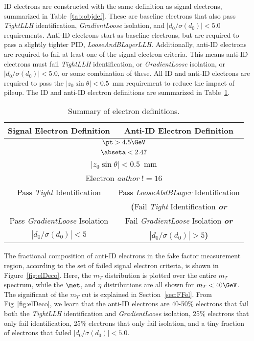 ID electrons are constructed with the same definition as signal electrons, summarized in Table~\ref{tab:objdef}.  These are baseline electrons that also pass \textit{TightLLH} identification, \textit{GradientLoose} isolation, and $|d_0/\sigma(d_0)|<5.0$ requirements.  Anti-ID electrons start as baseline electrons, but are required to pass a slightly tighter PID, \textit{LooseAndBLayerLLH}.  Additionally, anti-ID electrons are required to fail at least one of the signal electron criteria.  This means anti-ID electrons must fail \textit{TightLLH} identification, or \textit{GradientLoose} isolation, or $|d_0/\sigma(d_0)|<5.0$, or some combination of these. %
All ID and anti-ID electrons are required to pass the $|z_0\sin\theta| < 0.5$~mm requirement to reduce the impact of pileup.  The ID and anti-ID electron definitions are summarized in Table~\ref{tab:AllElDefs}. 
\begin{table}[!htb]
\begin{center}
\begin{tabular}{c|c}
\hline
Signal Electron Definition  & Anti-ID Electron Definition \\
\hline \hline
\multicolumn{2}{c}{$\pt > 4.5\GeV$}      \\
\multicolumn{2}{c}{$\abseta < 2.47$ }     \\
\multicolumn{2}{c}{$|z_0\sin\theta| < 0.5$~mm} \\
\multicolumn{2}{c}{Electron \textit{author} $!= 16$}\\
Pass \textit{Tight} Identification & Pass \textit{LooseAbdBLayer} Identification\\
      &             \textbf{(}Fail \textit{Tight} Identification \textbf{\textit{or}} \\
Pass \textit{GradientLoose} Isolation  & Fail \textit{GradientLoose} Isolation \textbf{\textit{or}} \\   
$|d_0/\sigma(d_0)| < 5$  &   $|d_0/\sigma(d_0)| > 5$\textbf{)} \\
\hline
\end{tabular}
\caption{Summary of electron definitions.}
\label{tab:AllElDefs}
\end{center}
\end{table}
The fractional composition of anti-ID electrons in the fake factor measurement region, according to the set of failed signal electron criteria, is shown in Figure~\ref{fig:elDeco}. Here, the $m_{T}$ distribution is plotted over the entire $m_{T}$ spectrum, while the $\met$, \pt{} and $\eta$ distributions are all shown for $m_{T} <40\GeV$.  The significant of the $m_{T}$ cut is explained in Section~\ref{sec:FFel}.  From Fig~\ref{fig:elDeco}, we learn that the anti-ID electrons are 40-50$\%$ electrons that fail both the \textit{TightLLH} identification and \textit{GradientLoose} isolation, 25$\%$ electrons that only fail identification, 25$\%$ electrons that only fail isolation, and a tiny fraction of electrons that failed $|d_0/\sigma(d_0)|<5.0$. 

